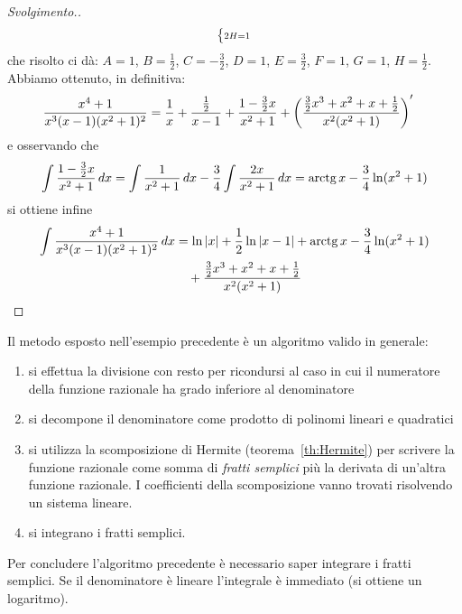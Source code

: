 \begin{proof}[Svolgimento.]
\[\begin{dcases}
    \scriptstyle
    2H=1
  \end{dcases}
\]
che risolto ci dà: $A=1$, $B=\frac 1 2$, $C = -\frac 3 2$, $D=1$, $E=\frac 3 2$, $F=1$, $G=1$, $H=\frac 1 2$.
Abbiamo ottenuto, in definitiva:
\begin{align*}
\frac{x^4+1}{x^3(x-1)(x^2+1)^2}
&= \frac{1}{x} + \frac{\frac 1 2}{x-1} + \frac{1 - \frac 3 2 x}{x^2+1}
+ {\left( \frac{\frac 3 2 x^3 + x^2 + x + \frac 1 2}{x^2(x^2+1)} \right)}'
\end{align*}
e osservando che
\[
 \int \frac{1 - \frac 3 2 x}{x^2+1}\, dx
 = \int \frac{1}{x^2+1}\, dx - \frac 3 4 \int \frac{2x}{x^2+1}\, dx
 = \operatorname{arctg} x - \frac 3 4 \ln(x^2+1)
\]
si ottiene infine
\begin{align*}
\int \frac{x^4+1}{x^3(x-1)(x^2+1)^2}\, dx
 &= \ln {\left|x\right|} + \frac 1 2 \ln{\left|x-1\right|} + \operatorname{arctg} x - \frac 3 4 \ln(x^2+1) \\
 &\quad + \frac{\frac 3 2 x^3 + x^2+x+\frac 1 2}{x^2(x^2+1)}
\end{align*}
\end{proof}

Il metodo esposto nell'esempio precedente è un algoritmo 
valido in generale:
\begin{enumerate}
  \item si effettua la divisione con resto per ricondursi
  al caso in cui il numeratore della funzione razionale
  ha grado inferiore al denominatore
  \item si decompone il denominatore come prodotto di
  polinomi lineari e quadratici
  \item si utilizza la scomposizione di Hermite (teorema~\ref{th:Hermite})
  per scrivere la funzione razionale come somma di \emph{fratti semplici}
  più la derivata di un'altra funzione razionale. I coefficienti
  della scomposizione vanno trovati risolvendo un sistema lineare.
  \item si integrano i fratti semplici.
\end{enumerate}

Per concludere l'algoritmo precedente è necessario saper integrare i fratti semplici. Se il denominatore è lineare l'integrale è immediato (si ottiene un logaritmo).


